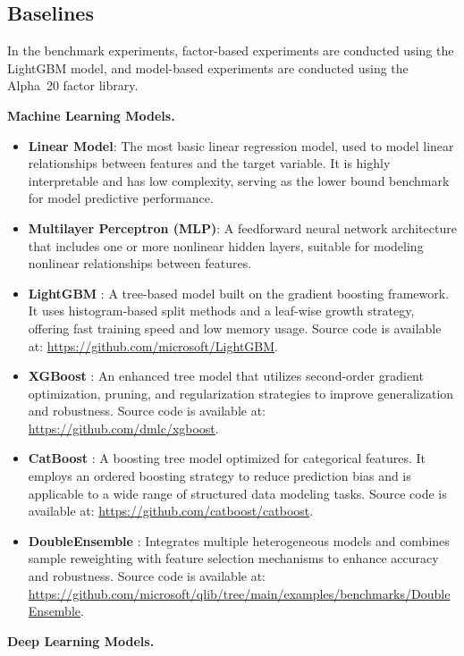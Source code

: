 \documentclass{article}
\begin{document}
\subsection{Baselines} \label{app:baselines}
In the benchmark experiments, factor-based experiments are conducted using the LightGBM model, and model-based experiments are conducted using the Alpha~20 factor library.

\textbf{Machine Learning Models.}
\begin{itemize}[leftmargin=4ex]
    \item \textbf{Linear Model}: The most basic linear regression model, used to model linear relationships between features and the target variable. It is highly interpretable and has low complexity, serving as the lower bound benchmark for model predictive performance.
    \item \textbf{Multilayer Perceptron (MLP)}: A feedforward neural network architecture that includes one or more nonlinear hidden layers, suitable for modeling nonlinear relationships between features.
    \item \textbf{LightGBM} \cite{ke2017lightgbm}: A tree-based model built on the gradient boosting framework. It uses histogram-based split methods and a leaf-wise growth strategy, offering fast training speed and low memory usage. Source code is available at: \url{https://github.com/microsoft/LightGBM}.
    \item \textbf{XGBoost} \cite{chen2016xgboost}: An enhanced tree model that utilizes second-order gradient optimization, pruning, and regularization strategies to improve generalization and robustness. Source code is available at: \url{https://github.com/dmlc/xgboost}.
    \item \textbf{CatBoost} \cite{prokhorenkova2018catboost}: A boosting tree model optimized for categorical features. It employs an ordered boosting strategy to reduce prediction bias and is applicable to a wide range of structured data modeling tasks. Source code is available at: \url{https://github.com/catboost/catboost}.
    \item \textbf{DoubleEnsemble} \cite{zhang2020doubleensemble}: Integrates multiple heterogeneous models and combines sample reweighting with feature selection mechanisms to enhance accuracy and robustness. Source code is available at: \url{https://github.com/microsoft/qlib/tree/main/examples/benchmarks/DoubleEnsemble}.
\end{itemize}

\textbf{Deep Learning Models.}
\end{document}
